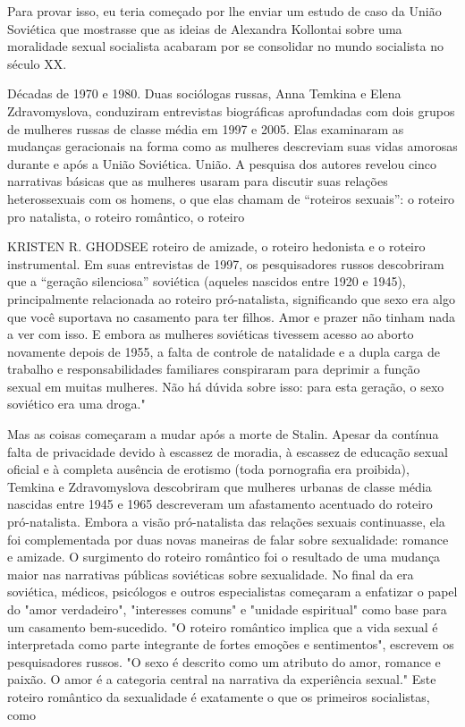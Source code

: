  \par 
Para provar isso, eu teria começado por lhe enviar um estudo de caso da União Soviética que mostrasse que as ideias de Alexandra Kollontai sobre uma moralidade sexual socialista acabaram por se consolidar no mundo socialista no século XX.
 \par 
Décadas de 1970 e 1980. Duas sociólogas russas, Anna Temkina e Elena Zdravomyslova, conduziram entrevistas biográficas aprofundadas com dois grupos de mulheres russas de classe média em 1997 e 2005. Elas examinaram as mudanças geracionais na forma como as mulheres descreviam suas vidas amorosas durante e após a União Soviética. União. A pesquisa dos autores revelou cinco narrativas básicas que as mulheres usaram para discutir suas relações heterossexuais com os homens, o que elas chamam de “roteiros sexuais”: o roteiro pro natalista, o roteiro romântico, o roteiro
 \par 
KRISTEN R. GHODSEE roteiro de amizade, o roteiro hedonista e o roteiro instrumental. Em suas entrevistas de 1997, os pesquisadores russos descobriram que a “geração silenciosa” soviética (aqueles nascidos entre 1920 e 1945), principalmente relacionada ao roteiro pró-natalista, significando que sexo era algo que você suportava no casamento para ter filhos. Amor e prazer não tinham nada a ver com isso. E embora as mulheres soviéticas tivessem acesso ao aborto novamente depois de 1955, a falta de controle de natalidade e a dupla carga de trabalho e responsabilidades familiares conspiraram para deprimir a função sexual em muitas mulheres. Não há dúvida sobre isso: para esta geração, o sexo soviético era uma droga."
 \par 
Mas as coisas começaram a mudar após a morte de Stalin. Apesar da contínua falta de privacidade devido à escassez de moradia, à escassez de educação sexual oficial e à completa ausência de erotismo (toda pornografia era proibida), Temkina e Zdravomyslova descobriram que mulheres urbanas de classe média nascidas entre 1945 e 1965 descreveram um afastamento acentuado do roteiro pró-natalista. Embora a visão pró-natalista das relações sexuais continuasse, ela foi complementada por duas novas maneiras de falar sobre sexualidade: romance e amizade. O surgimento do roteiro romântico foi o resultado de uma mudança maior nas narrativas públicas soviéticas sobre sexualidade. No final da era soviética, médicos, psicólogos e outros especialistas começaram a enfatizar o papel do "amor verdadeiro", "interesses comuns" e "unidade espiritual" como base para um casamento bem-sucedido. "O roteiro romântico implica que a vida sexual é interpretada como parte integrante de fortes emoções e sentimentos", escrevem os pesquisadores russos. "O sexo é descrito como um atributo do amor, romance e paixão. O amor é a categoria central na narrativa da experiência sexual." Este roteiro romântico da sexualidade é exatamente o que os primeiros socialistas, como
